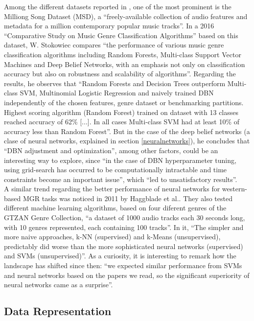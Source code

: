 Among the different datasets reported in \cite{mgr_survey}, one of the most prominent is the Milliong Song Dataset (MSD), a ``freely-available collection of audio features and metadata for a million contemporary popular music tracks''\msdataset. In a 2016 ``Comparative Study on Music Genre Classification Algorithms''\cite{stokowiec} based on this dataset, W. Stokowiec compares ``the performance of various music genre classification algorithms including Random Forests, Multi-class Support Vector Machines and Deep Belief Networks, with an emphasis not only on classification accuracy but also on robustness and scalability of algorithms''. Regarding the results, he observes that ``Random Forests and Decision Trees outperform Multi-class SVM, Multinomial Logistic Regression and naively trained DBN independently of the chosen features, genre dataset or benchmarking partitions. Highest scoring algorithm (Random Forest) trained on dataset with 13 classes reached accuracy of 62\% [...]. In all cases Multi-class SVM had at least 10\% of accuracy less than Random Forest''. But in the case of the deep belief networks (a clase of neural networks, explained in section \ref{neuralnetworks}), he concludes that ``DBN adjustment and optimization'', among other factors, could be an interesting way to explore, since ``in the case of DBN hyperparameter tuning, using grid-search has occurred to be computationally intractable and time constraints become an important issue'', which ``led to unsatisfactory results''.\\

A similar trend regarding the better performance of neural networks for western-based MGR tasks was noticed in 2011 by Haggblade et al.\cite{haggblade}. They also tested different machine learning algorithms, based on four diferent genres of the GTZAN Genre Collection, ``a dataset of 1000 audio tracks each 30 seconds long, with 10 genres represented, each containing 100 tracks''. In it, ``The simpler and more naive approaches, k-NN (supervised) and k-Means (unsupervised), predictably did worse than the more sophisticated neural networks (supervised) and SVMs (unsupervised)''. As a curiosity, it is interesting to remark how the landscape has shifted since then: ``we expected similar performance from SVMs and neural networks based on the papers we read, so the significant superiority of neural networks came as a surprise''.\\


\subsection{Data Representation}

